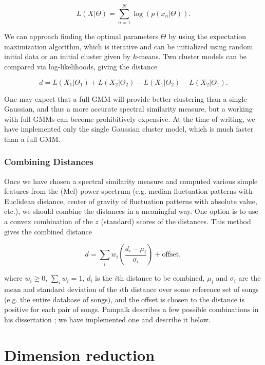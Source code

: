 \documentclass[12pt]{article}
\begin{document}
\[ L(X|\Theta) = \sum_{n=1}^N \log\left(p(x_n|\Theta)\right). \]

\noindent We can approach finding the optimal parameters $\Theta$ by using the expectation maximization algorithm, which is iterative and can be initialized using random initial data or an initial cluster given by $k$-means.  Two cluster models can be compared via log-likelihoods, giving the distance

\[ d = L(X_1|\Theta_1) + L(X_2|\Theta_2) - L(X_1|\Theta_2) - L(X_2|\Theta_1). \]

One may expect that a full GMM will provide better clustering than a single Gaussian, and thus a more accurate spectral similarity measure, but a working with full GMMs can become prohibitively expensive.  At the time of writing, we have implemented only the single Gaussian cluster model, which is much faster than a full GMM.\\

\subsubsection{Combining Distances}

Once we have chosen a spectral similarity measure and computed various simple features from the (Mel) power spectrum (e.g. median fluctuation patterns with Euclidean distance, center of gravity of fluctuation patterns with absolute value, etc.), we should combine the distances in a meaningful way.  One option is to use a convex combination of the $z$ (standard) scores of the distances.  This method gives the combined distance

\[ d = \sum_{i} w_i \left(\dfrac{d_i - \mu_i}{\sigma_i}\right) + \text{offset}, \]

\noindent where $w_i\ge 0$, $\sum_i w_i=1$, $d_i$ is the $i$th distance to be combined, $\mu_i$ and $\sigma_i$ are the mean and standard deviation of the $i$th distance over some reference set of songs (e.g. the entire database of songs), and the offset is chosen to the distance is positive for each pair of songs.  Pampalk describes a few possible combinations in his dissertation \cite{pampalk:dissertation}; we have implemented one and describe it below.\\


\section{Dimension reduction}
%
\end{document}
